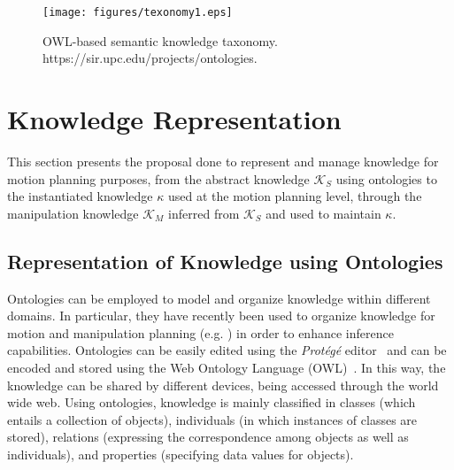 \documentclass[twocolumn]{svjour3}          %
\newcommand {\comment}[1] {{\small \color{RedOrange}{\bfseries [#1]}}}
\begin{document}
 
 
 \begin{figure}[t]
\begin{center}
   \texttt{[image: figures/texonomy1.eps]}
   \caption{OWL-based semantic knowledge taxonomy. 
https://sir.upc.edu/projects/ontologies.}\label{fig:texonomy}
\end{center}
\end{figure}
\section{Knowledge Representation}\label{s-Knowledgerepresentation}

   This section presents the proposal done to represent and manage knowledge for motion planning purposes, from the abstract knowledge $\mathcal{K}_S$ using ontologies to the instantiated knowledge $\kappa$ used at the motion planning level, through the manipulation knowledge  $\mathcal{K}_M$ inferred from  $\mathcal{K}_S$  and used to maintain  $\kappa$.
    
\subsection{ Representation of Knowledge using Ontologies}

Ontologies can be employed to model and organize knowledge within different domains.
In particular, they have  recently been used
to organize knowledge for motion and manipulation planning (e.g. \cite{feyzabadi2014}\cite{Ali2015}) in order to enhance inference capabilities.
 Ontologies can be easily edited using the \textit{Prot\'eg\'e} editor~\cite{protege} and can be encoded and stored using the Web Ontology Language (OWL)~\cite{owl2004}. In this way, the knowledge can 
be shared by different devices, being accessed through the world wide web.
  Using ontologies, knowledge is mainly classified in classes (which entails a collection of objects), individuals (in which instances of classes are stored), relations (expressing the correspondence 
among objects as well as individuals), and properties (specifying data values for objects).
\end{document}
